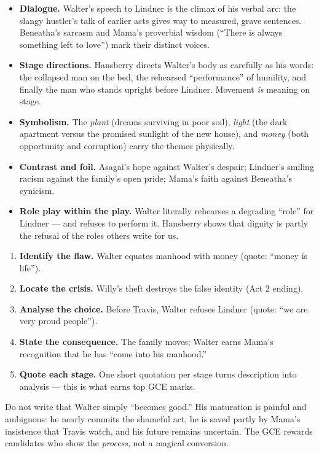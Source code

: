 \documentclass[11pt]{article}
\begin{document}
\begin{itemize}
\item \textbf{Dialogue.} Walter's speech to Lindner is the climax of his verbal arc: the slangy hustler's talk of earlier acts gives way to measured, grave sentences. Beneatha's sarcasm and Mama's proverbial wisdom (``There is always something left to love'') mark their distinct voices.
\item \textbf{Stage directions.} Hansberry directs Walter's body as carefully as his words: the collapsed man on the bed, the rehearsed ``performance'' of humility, and finally the man who stands upright before Lindner. Movement \emph{is} meaning on stage.
\item \textbf{Symbolism.} The \emph{plant} (dreams surviving in poor soil), \emph{light} (the dark apartment versus the promised sunlight of the new house), and \emph{money} (both opportunity and corruption) carry the themes physically.
\item \textbf{Contrast and foil.} Asagai's hope against Walter's despair; Lindner's smiling racism against the family's open pride; Mama's faith against Beneatha's cynicism.
\item \textbf{Role play within the play.} Walter literally rehearses a degrading ``role'' for Lindner — and refuses to perform it. Hansberry shows that dignity is partly the refusal of the roles others write for us.
\end{itemize}

\begin{methode}
\begin{enumerate}
\item \textbf{Identify the flaw.} Walter equates manhood with money (quote: ``money is life'').
\item \textbf{Locate the crisis.} Willy's theft destroys the false identity (Act 2 ending).
\item \textbf{Analyse the choice.} Before Travis, Walter refuses Lindner (quote: ``we are very proud people'').
\item \textbf{State the consequence.} The family moves; Walter earns Mama's recognition that he has ``come into his manhood.''
\item \textbf{Quote each stage.} One short quotation per stage turns description into analysis — this is what earns top GCE marks.
\end{enumerate}
\end{methode}

\begin{attention}
Do not write that Walter simply ``becomes good.'' His maturation is painful and ambiguous: he nearly commits the shameful act, he is saved partly by Mama's insistence that Travis watch, and his future remains uncertain. The GCE rewards candidates who show the \emph{process}, not a magical conversion.
\end{attention}
\end{document}
